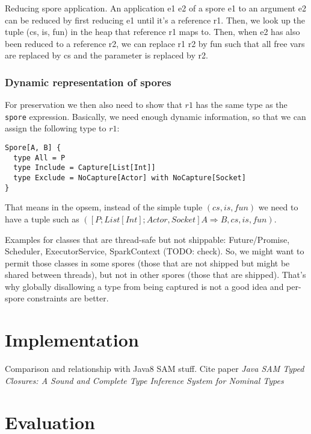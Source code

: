 \documentclass{llncs}
\begin{document}
Reducing spore application. An application e1 e2 of a spore e1 to an argument
e2 can be reduced by first reducing e1 until it's a reference r1. Then, we
look up the tuple (cs, is, fun) in the heap that reference r1 maps to. Then,
when e2 has also been reduced to a reference r2, we can replace r1 r2 by fun
such that all free vars are replaced by cs and the parameter is replaced by
r2.

\subsubsection{Dynamic representation of spores}

For preservation we then also need to show that $r1$ has the same type as the
\verb|spore| expression. Basically, we need enough dynamic information, so
that we can assign the following type to $r1$:

\begin{lstlisting}
Spore[A, B] {
  type All = P
  type Include = Capture[List[Int]]
  type Exclude = NoCapture[Actor] with NoCapture[Socket]
}
\end{lstlisting}

That means in the opsem, instead of the simple tuple $(cs, is, fun)$ we need to
have a tuple such as
$([{P} ; {List[Int]} ; {Actor, Socket}] A \Rightarrow B, cs, is, fun)$.

Examples for classes that are thread-safe but not shippable: Future/Promise,
Scheduler, ExecutorService, SparkContext (TODO: check). So, we might want to
permit those classes in some spores (those that are not shipped but might be
shared between threads), but not in other spores (those that are shipped).
That's why globally disallowing a type from being captured is not a good idea
and per-spore constraints are better.


\section{Implementation}

Comparison and relationship with Java8 SAM stuff. Cite paper {\em Java SAM Typed Closures: A Sound and Complete Type Inference System for Nominal Types} ~\cite{JavaSAM}

\section{Evaluation}

%
\end{document}
